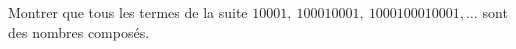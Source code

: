 Montrer que tous les termes de la suite $10001,\ 100010001,\ 1000100010001, \ldots$ sont des nombres composés.
